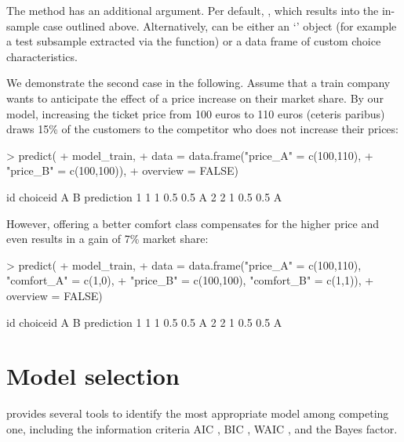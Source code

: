 \documentclass[article,shortnames]{jss}
\newcommand{\class}[1]{`\code{#1}'}
\newcommand{\fct}[1]{\code{#1()}}
\begin{document}
The \fct{predict} method has an additional  argument. Per default, , which results into the in-sample case outlined above. Alternatively,  can be either an \class{RprobitB\_data} object (for example a test subsample extracted via the \fct{train\_test} function) or a data frame of custom choice characteristics.

We demonstrate the second case in the following. Assume that a train company wants to anticipate the effect of a price increase on their market share. By our model, increasing the ticket price from 100 euros to 110 euros (ceteris paribus) draws 15\% of the customers to the competitor who does not increase their prices:

\begin{Schunk}
\begin{Sinput}
> predict(
+    model_train,
+    data = data.frame("price_A" = c(100,110),
+                      "price_B" = c(100,100)),
+    overview = FALSE)
\end{Sinput}
\begin{Soutput}
  id choiceid   A   B prediction
1  1        1 0.5 0.5          A
2  2        1 0.5 0.5          A
\end{Soutput}
\end{Schunk}

However, offering a better comfort class compensates for the higher price and even results in a gain of 7\% market share:

\begin{Schunk}
\begin{Sinput}
> predict(
+    model_train,
+    data = data.frame("price_A" = c(100,110), "comfort_A" = c(1,0),
+                      "price_B" = c(100,100), "comfort_B" = c(1,1)),
+    overview = FALSE)
\end{Sinput}
\begin{Soutput}
  id choiceid   A   B prediction
1  1        1 0.5 0.5          A
2  2        1 0.5 0.5          A
\end{Soutput}
\end{Schunk}

\section{Model selection} \label{sec:model_selection}

 provides several tools to identify the most appropriate model among competing one, including the information criteria AIC \citep{Akaike:1974}, BIC \citep{Schwarz:1978}, WAIC \citep{Watanabe:2010}, and the Bayes factor.
\end{document}
